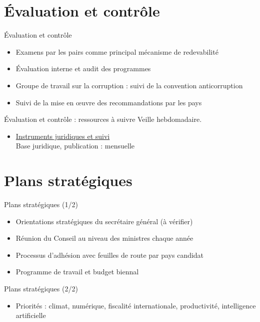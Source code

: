 \documentclass[aspectratio=169,11pt]{beamer}
\begin{document}
\section{Évaluation et contrôle}
\begin{frame}{Évaluation et contrôle}
\begin{itemize}
\item Examens par les pairs comme principal mécanisme de redevabilité
\item Évaluation interne et audit des programmes
\item Groupe de travail sur la corruption : suivi de la convention anticorruption
\item Suivi de la mise en œuvre des recommandations par les pays
\end{itemize}
\end{frame}

\begin{frame}{Évaluation et contrôle : ressources à suivre}
\small
Veille hebdomadaire.
\begin{itemize}
\item \href{https://legalinstruments.oecd.org}{Instruments juridiques et suivi}\\{\footnotesize Base juridique, publication : mensuelle}
\end{itemize}
\end{frame}

\section{Plans stratégiques}
\begin{frame}{Plans stratégiques (1/2)}
\begin{itemize}
\item Orientations stratégiques du secrétaire général (à vérifier)
\item Réunion du Conseil au niveau des ministres chaque année
\item Processus d'adhésion avec feuilles de route par pays candidat
\item Programme de travail et budget biennal
\end{itemize}
\end{frame}

\begin{frame}{Plans stratégiques (2/2)}
\begin{itemize}
\item Priorités : climat, numérique, fiscalité internationale, productivité, intelligence artificielle
\end{itemize}
\end{frame}
\end{document}
